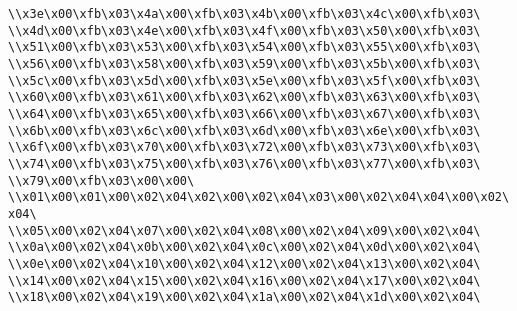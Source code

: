 \verb|\\x3e\x00\xfb\x03\x4a\x00\xfb\x03\x4b\x00\xfb\x03\x4c\x00\xfb\x03\|\newline
\verb|\\x4d\x00\xfb\x03\x4e\x00\xfb\x03\x4f\x00\xfb\x03\x50\x00\xfb\x03\|\newline
\verb|\\x51\x00\xfb\x03\x53\x00\xfb\x03\x54\x00\xfb\x03\x55\x00\xfb\x03\|\newline
\verb|\\x56\x00\xfb\x03\x58\x00\xfb\x03\x59\x00\xfb\x03\x5b\x00\xfb\x03\|\newline
\verb|\\x5c\x00\xfb\x03\x5d\x00\xfb\x03\x5e\x00\xfb\x03\x5f\x00\xfb\x03\|\newline
\verb|\\x60\x00\xfb\x03\x61\x00\xfb\x03\x62\x00\xfb\x03\x63\x00\xfb\x03\|\newline
\verb|\\x64\x00\xfb\x03\x65\x00\xfb\x03\x66\x00\xfb\x03\x67\x00\xfb\x03\|\newline
\verb|\\x6b\x00\xfb\x03\x6c\x00\xfb\x03\x6d\x00\xfb\x03\x6e\x00\xfb\x03\|\newline
\verb|\\x6f\x00\xfb\x03\x70\x00\xfb\x03\x72\x00\xfb\x03\x73\x00\xfb\x03\|\newline
\verb|\\x74\x00\xfb\x03\x75\x00\xfb\x03\x76\x00\xfb\x03\x77\x00\xfb\x03\|\newline
\verb|\\x79\x00\xfb\x03\x00\x00\|\newline
\verb|\\x01\x00\x01\x00\x02\x04\x02\x00\x02\x04\x03\x00\x02\x04\x04\x00\x02\x04\|\newline
\verb|\\x05\x00\x02\x04\x07\x00\x02\x04\x08\x00\x02\x04\x09\x00\x02\x04\|\newline
\verb|\\x0a\x00\x02\x04\x0b\x00\x02\x04\x0c\x00\x02\x04\x0d\x00\x02\x04\|\newline
\verb|\\x0e\x00\x02\x04\x10\x00\x02\x04\x12\x00\x02\x04\x13\x00\x02\x04\|\newline
\verb|\\x14\x00\x02\x04\x15\x00\x02\x04\x16\x00\x02\x04\x17\x00\x02\x04\|\newline
\verb|\\x18\x00\x02\x04\x19\x00\x02\x04\x1a\x00\x02\x04\x1d\x00\x02\x04\|\newline
